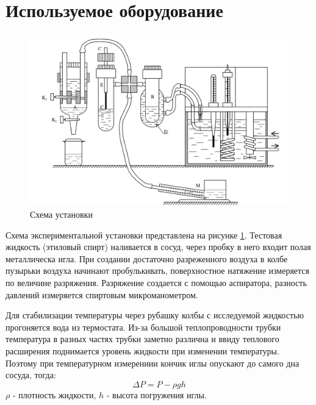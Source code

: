 \documentclass[a4paper,12pt]{article} %
\begin{document}

\newpage
\section{Используемое оборудование}

\begin{figure}[h!]
\begin{center}
\includegraphics[width=\textwidth]{установка.jpg}
\end{center}
\caption{Схема установки} \label{установка}
\end{figure}

Схема экспериментальной установки представлена на рисунке \ref{установка}.
Тестовая жидкость (этиловый спирт) наливается в сосуд, через пробку в него входит полая металлическа игла. При создании достаточно разреженного воздуха в колбе пузырьки воздуха начинают пробулькивать, поверхностное натяжение измеряется по величине разряжения. Разряжение создается с помощью аспиратора, разность давлений измеряется спиртовым микроманометром.

Для стабилизации температуры через рубашку колбы с исследуемой жидкостью прогоняется вода из термостата. Из-за большой теплопроводности трубки температура в разных частях трубки заметно различна и ввиду теплового расширения поднимается уровень жидкости при изменении температуры. Поэтому при температурном измерениии кончик иглы опускают до самого дна сосуда, тогда:
\begin{equation}
\Delta P = P - \rho g h
\end{equation}
$\rho$ - плотность жидкости, $h$ - высота погружения иглы.


\end{document}
